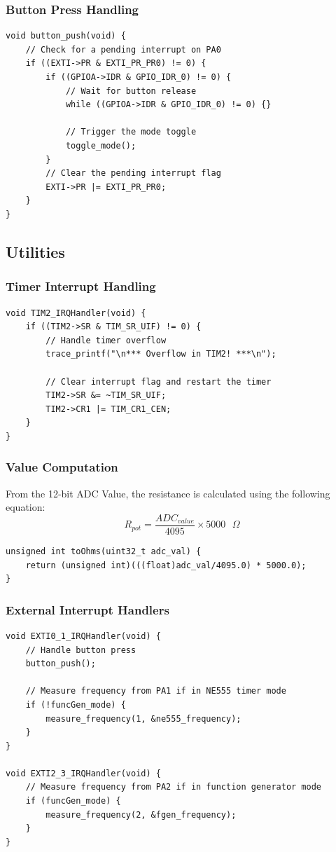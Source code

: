 \subsubsection{Button Press Handling \cite{iox}}
\begin{lstlisting}[caption=Button Push Handler Function]
void button_push(void) {
    // Check for a pending interrupt on PA0
    if ((EXTI->PR & EXTI_PR_PR0) != 0) {
        if ((GPIOA->IDR & GPIO_IDR_0) != 0) {
            // Wait for button release
            while ((GPIOA->IDR & GPIO_IDR_0) != 0) {}
            
            // Trigger the mode toggle
            toggle_mode();
        }
        // Clear the pending interrupt flag
        EXTI->PR |= EXTI_PR_PR0;
    }
}
\end{lstlisting}

\subsection{Utilities}
\subsubsection{Timer Interrupt Handling \cite{iox}}
\begin{lstlisting}[caption=Timer 2 Interrupt Handler]
void TIM2_IRQHandler(void) {
    if ((TIM2->SR & TIM_SR_UIF) != 0) {
        // Handle timer overflow
        trace_printf("\n*** Overflow in TIM2! ***\n");

        // Clear interrupt flag and restart the timer
        TIM2->SR &= ~TIM_SR_UIF;
        TIM2->CR1 |= TIM_CR1_CEN;
    }
}
\end{lstlisting}

\subsubsection{Value Computation}
From the 12-bit ADC Value, the resistance is calculated using the following equation:
$$R_{pot} = \frac{ADC_{value}}{4095} \times 5000 \text{ } \Omega$$

\begin{lstlisting}[caption=Resistance Calculation Function]
unsigned int toOhms(uint32_t adc_val) {
    return (unsigned int)(((float)adc_val/4095.0) * 5000.0);
}
\end{lstlisting}

\subsubsection{External Interrupt Handlers}
\begin{lstlisting}[caption=EXTI0 and EXTI2 Handlers]
void EXTI0_1_IRQHandler(void) {
    // Handle button press
    button_push();

    // Measure frequency from PA1 if in NE555 timer mode
    if (!funcGen_mode) {
        measure_frequency(1, &ne555_frequency);
    }
}

void EXTI2_3_IRQHandler(void) {
    // Measure frequency from PA2 if in function generator mode
    if (funcGen_mode) {
        measure_frequency(2, &fgen_frequency);
    }
}
\end{lstlisting}

